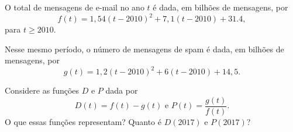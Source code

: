 O total de mensagens de e-mail no ano $t$ é dada, em bilhões de mensagens, por
\[
	f(t)=1,54(t-2010)^2+7,1(t-2010)+31.4,
\]
para $t\geq 2010$.

Nesse mesmo período, o número de mensagens de spam é dada, em bilhões de mensagens, por
\[
	g(t)=1,2(t-2010)^2+6(t-2010)+14,5.
\]

Considere as funções $D$ e $P$ dada por
\[
	D(t)=f(t)-g(t)\mbox{ e }P(t)=\frac{g(t)}{f(t)}.
\]
O que essas funções representam? Quanto é $D(2017)$ e $P(2017)$?
